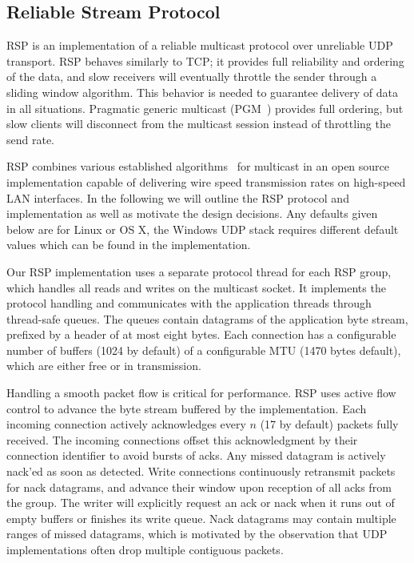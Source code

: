 \documentclass[10pt,journal,compsoc]{IEEEtran}
\begin{document}
\subsection{Reliable Stream Protocol}\label{sec:RSP}

RSP is an implementation of a reliable multicast protocol over unreliable UDP
transport. RSP behaves similarly to TCP; it provides full reliability and
ordering of the data, and slow receivers will eventually throttle the sender
through a sliding window algorithm. This behavior is needed to guarantee
delivery of data in all situations. Pragmatic generic multicast (PGM~\cite{pgm})
provides full ordering, but slow clients will disconnect from the multicast
session instead of throttling the send rate.

RSP combines various established algorithms~\cite{adamson2004negative,
  Gau:2002:MFC:506824.506832} for multicast in an open source implementation
capable of delivering wire speed transmission rates on high-speed LAN
interfaces. In the following we will outline the RSP protocol and implementation
as well as motivate the design decisions. Any defaults given below are for
Linux or OS X, the Windows UDP stack requires different default values which can
be found in the implementation.

Our RSP implementation uses a separate protocol thread for each RSP group, which
handles all reads and writes on the multicast socket. It implements the protocol
handling and communicates with the application threads through thread-safe
queues. The queues contain datagrams of the application byte stream, prefixed by
a header of at most eight bytes. Each connection has a configurable number of
buffers (1024 by default) of a configurable MTU (1470 bytes default), which are
either free or in transmission.

Handling a smooth packet flow is critical for performance. RSP uses active flow
control to advance the byte stream buffered by the implementation. Each incoming
connection actively acknowledges every $n$ (17 by default) packets fully
received. The incoming connections offset this acknowledgment by their
connection identifier to avoid bursts of acks. Any missed datagram is actively
nack'ed as soon as detected. Write connections continuously retransmit packets
for nack datagrams, and advance their window upon reception of all acks from the
group. The writer will explicitly request an ack or nack when it runs out of
empty buffers or finishes its write queue. Nack datagrams may contain multiple
ranges of missed datagrams, which is motivated by the observation that UDP
implementations often drop multiple contiguous packets.
\end{document}
